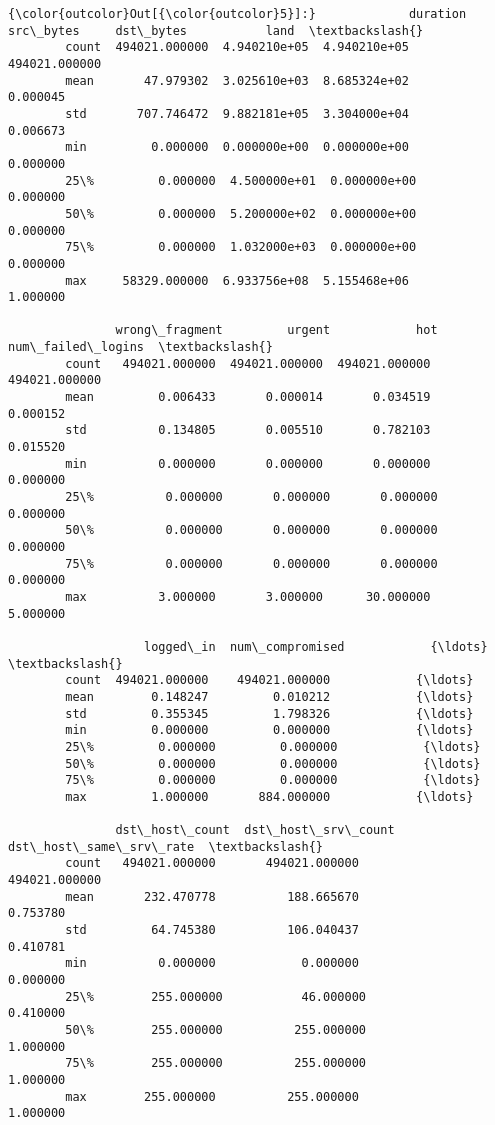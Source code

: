 \documentclass[11pt]{article}
\begin{document}
\begin{Verbatim}[commandchars=\\\{\}]
{\color{outcolor}Out[{\color{outcolor}5}]:}             duration     src\_bytes     dst\_bytes           land  \textbackslash{}
        count  494021.000000  4.940210e+05  4.940210e+05  494021.000000   
        mean       47.979302  3.025610e+03  8.685324e+02       0.000045   
        std       707.746472  9.882181e+05  3.304000e+04       0.006673   
        min         0.000000  0.000000e+00  0.000000e+00       0.000000   
        25\%         0.000000  4.500000e+01  0.000000e+00       0.000000   
        50\%         0.000000  5.200000e+02  0.000000e+00       0.000000   
        75\%         0.000000  1.032000e+03  0.000000e+00       0.000000   
        max     58329.000000  6.933756e+08  5.155468e+06       1.000000   
        
               wrong\_fragment         urgent            hot  num\_failed\_logins  \textbackslash{}
        count   494021.000000  494021.000000  494021.000000      494021.000000   
        mean         0.006433       0.000014       0.034519           0.000152   
        std          0.134805       0.005510       0.782103           0.015520   
        min          0.000000       0.000000       0.000000           0.000000   
        25\%          0.000000       0.000000       0.000000           0.000000   
        50\%          0.000000       0.000000       0.000000           0.000000   
        75\%          0.000000       0.000000       0.000000           0.000000   
        max          3.000000       3.000000      30.000000           5.000000   
        
                   logged\_in  num\_compromised            {\ldots}             \textbackslash{}
        count  494021.000000    494021.000000            {\ldots}              
        mean        0.148247         0.010212            {\ldots}              
        std         0.355345         1.798326            {\ldots}              
        min         0.000000         0.000000            {\ldots}              
        25\%         0.000000         0.000000            {\ldots}              
        50\%         0.000000         0.000000            {\ldots}              
        75\%         0.000000         0.000000            {\ldots}              
        max         1.000000       884.000000            {\ldots}              
        
               dst\_host\_count  dst\_host\_srv\_count  dst\_host\_same\_srv\_rate  \textbackslash{}
        count   494021.000000       494021.000000           494021.000000   
        mean       232.470778          188.665670                0.753780   
        std         64.745380          106.040437                0.410781   
        min          0.000000            0.000000                0.000000   
        25\%        255.000000           46.000000                0.410000   
        50\%        255.000000          255.000000                1.000000   
        75\%        255.000000          255.000000                1.000000   
        max        255.000000          255.000000                1.000000   
        

\end{Verbatim}
\end{document}
